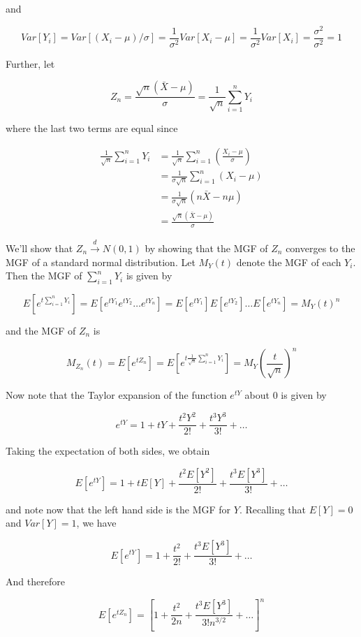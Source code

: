 \documentclass[
  letterpaper,
  DIV=11,
  numbers=noendperiod]{scrreprt}
\begin{document}
and

\[
Var[Y_i] = Var\left[ (X_i - \mu)/\sigma\right] = \frac{1}{\sigma^2} Var[X_i - \mu] = \frac{1}{\sigma^2} Var[X_i] = \frac{\sigma^2}{\sigma^2} = 1
\]

Further, let

\[
Z_n = \frac{\sqrt{n}(\bar{X} - \mu)}{\sigma} = \frac{1}{\sqrt{n}} \sum_{i = 1}^n Y_i
\]

where the last two terms are equal since

\begin{align*}
    \frac{1}{\sqrt{n}} \sum_{i = 1}^n Y_i & = \frac{1}{\sqrt{n}} \sum_{i = 1}^n \left( \frac{X_i - \mu}{\sigma}\right)\\
    & = \frac{1}{\sigma\sqrt{n}} \sum_{i = 1}^n (X_i - \mu) \\
    & = \frac{1}{\sigma\sqrt{n}}  (n\bar{X} - n\mu) \\
    & = \frac{\sqrt{n}(\bar{X} - \mu)}{\sigma}
\end{align*}

We'll show that \(Z_n \overset{d}{\to} N(0,1)\) by showing that the MGF
of \(Z_n\) converges to the MGF of a standard normal distribution. Let
\(M_Y(t)\) denote the MGF of each \(Y_i\). Then the MGF of
\(\sum_{i = 1}^n Y_i\) is given by

\[
E[e^{t\sum_{i = 1}^n Y_i}] = E[e^{tY_1}e^{tY_2} \dots e^{tY_n}] = E[e^{tY_1}]E[e^{tY_2}] \dots E[e^{tY_n}] = M_Y(t)^n
\]

and the MGF of \(Z_n\) is

\[
M_{Z_n}(t) = E[e^{tZ_n}] = E[e^{t\frac{1}{\sqrt{n}}\sum_{i = 1}^n Y_i}] = M_Y\left(\frac{t}{\sqrt{n}}\right)^n
\]

Now note that the Taylor expansion of the function \(e^{tY}\) about
\(0\) is given by

\[
e^{tY} = 1 + tY + \frac{t^2Y^2}{2!} + \frac{t^3Y^3}{3!} + \dots
\]

Taking the expectation of both sides, we obtain

\[
E[e^{tY}] = 1 + tE[Y] + \frac{t^2E[Y^2]}{2!} + \frac{t^3E[Y^3]}{3!} + \dots
\]

and note now that the left hand side is the MGF for \(Y\). Recalling
that \(E[Y] = 0\) and \(Var[Y] = 1\), we have

\[
E[e^{tY}] = 1  + \frac{t^2}{2!} + \frac{t^3E[Y^3]}{3!} + \dots
\]

And therefore

\[
E[e^{tZ_n}] = \left[1  + \frac{t^2}{2n} + \frac{t^3E[Y^3]}{3!n^{3/2}} + \dots \right]^n
\]
\end{document}
